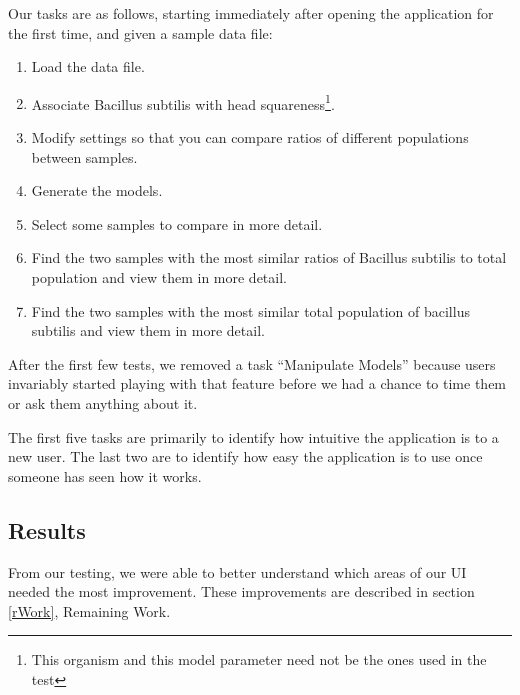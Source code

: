 \documentclass[letterpaper,10pt, onecolumn, draftclsnofoot]{IEEEtran}
\begin{document}
Our tasks are as follows, starting immediately after opening the application for the first time, and given a sample data file:
\begin{enumerate}
	\item Load the data file.
	\item Associate Bacillus subtilis with head squareness\footnote{This organism and this model parameter need not be the ones used in the test}.
	\item Modify settings so that you can compare ratios of different populations between samples.
	\item Generate the models.
	\item Select some samples to compare in more detail.
	\item Find the two samples with the most similar ratios of Bacillus subtilis to total population and view them in more detail.
	\item Find the two samples with the most similar total population of bacillus subtilis and view them in more detail.
\end{enumerate}

After the first few tests, we removed a task ``Manipulate Models'' because users invariably started playing with that feature before we had a chance to time them or ask them anything about it.

The first five tasks are primarily to identify how intuitive the application is to a new user. The last two are to identify how easy the application is to use once someone has seen how it works.

\subsection{Results}

From our testing, we were able to better understand which areas of our UI needed the most improvement. These improvements are described in section \ref{rWork}, Remaining Work.
\end{document}
